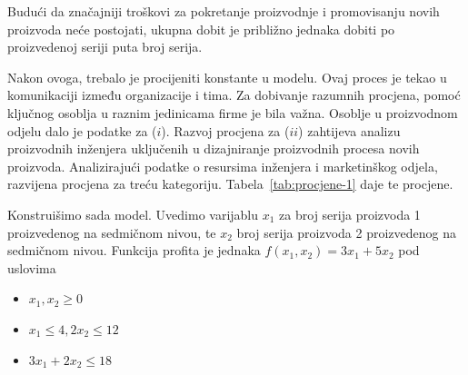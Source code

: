 \documentclass[a4paper, utf8, 11pt, colorlinks]{book}
\begin{document}
Budući da značajniji troškovi za pokretanje
 proizvodnje i promovisanju novih proizvoda neće postojati, ukupna dobit je približno jednaka dobiti po proizvedenoj seriji puta broj serija.  

Nakon ovoga, trebalo je procijeniti konstante u modelu. Ovaj proces je tekao u komunikaciji između organizacije i tima. 
Za dobivanje razumnih procjena, pomoć ključnog osoblja u raznim jedinicama firme je bila važna. Osoblje u proizvodnom odjelu dalo je podatke za ($i$). Razvoj procjena za ($ii$) zahtijeva analizu proizvodnih inženjera uključenih u dizajniranje proizvodnih procesa novih proizvoda. Analizirajući podatke o resursima inženjera i marketinškog odjela,  razvijena procjena za treću kategoriju. Tabela~\ref{tab:procjene-1} daje te procjene. 


\begin{table}[!ht]
    \centering
    \caption{Procjene konstanti modela.}
    \label{tab:procjene-1}
\end{table}

Konstruišimo sada model. Uvedimo varijablu $x_1$ za broj serija proizvoda 1 proizvedenog na sedmičnom nivou, te $x_2$ broj serija proizvoda 2 proizvedenog na sedmičnom nivou. Funkcija profita je jednaka $f(x_1, x_2) = 3 x_1 + 5 x_2$ pod uslovima
\begin{itemize}
    \item $x_1, x_2 \geq 0$
    \item  $x_1 \leq 4, 2 x_2 \leq 12$
    \item $3 x_1 + 2 x_2 \leq 18$
\end{itemize}
\end{document}
